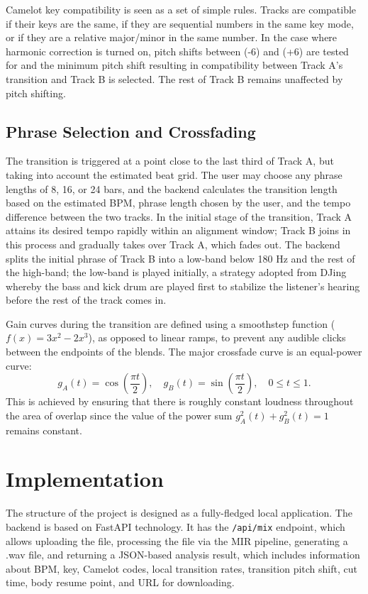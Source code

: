 \documentclass[11pt]{article}
\begin{document}
    Camelot key compatibility is seen as a set of simple rules. Tracks are compatible if their keys are the same, if they are sequential numbers in the same key mode, or if they are a relative major/minor in the same number. In the case where harmonic correction is turned on, pitch shifts between (-6) and (+6) are tested for and the minimum pitch shift resulting in compatibility between Track A's transition and Track B is selected. The rest of Track B remains unaffected by pitch shifting.

    \subsection{Phrase Selection and Crossfading}
    The transition is triggered at a point close to the last third of Track A, but taking into account the estimated beat grid. The user may choose any phrase lengths of 8, 16, or 24 bars, and the backend calculates the transition length based on the estimated BPM, phrase length chosen by the user, and the tempo difference between the two tracks. In the initial stage of the transition, Track A attains its desired tempo rapidly within an alignment window; Track B joins in this process and gradually takes over Track A, which fades out. The backend splits the initial phrase of Track B into a low-band below 180 Hz and the rest of the high-band; the low-band is played initially, a strategy adopted from DJing whereby the bass and kick drum are played first to stabilize the listener's hearing before the rest of the track comes in.

    Gain curves during the transition are defined using a smoothstep function ($f(x)=3x^{2}-2x^{3}$), as opposed to linear ramps, to prevent any audible clicks between the endpoints of the blends. The major crossfade curve is an equal-power curve:
    \[
        g_A(t) = \cos\left(\frac{\pi t}{2}\right),
        \quad
        g_B(t) = \sin\left(\frac{\pi t}{2}\right),
        \quad
        0 \leq t \leq 1.
    \]
    This is achieved by ensuring that there is roughly constant loudness throughout the area of overlap since the value of the power sum $g_A^2(t) + g_B^2(t) = 1$ remains constant.

    \section{Implementation}
    The structure of the project is designed as a fully-fledged local application. The backend is based on FastAPI technology. It has the \texttt{/api/mix} endpoint, which allows uploading the file, processing the file via the MIR pipeline, generating a .wav file, and returning a JSON-based analysis result, which includes information about BPM, key, Camelot codes, local transition rates, transition pitch shift, cut time, body resume point, and URL for downloading.
\end{document}
